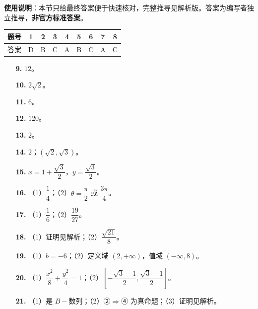 
\begin{gknotice}
\textbf{使用说明}：本节只给最终答案便于快速核对，完整推导见解析版。答案为编写者独立推导，\textbf{非官方标准答案}。
\end{gknotice}

\begin{center}\begin{tabular}{ccccccccc}
\toprule
题号 & 1 & 2 & 3 & 4 & 5 & 6 & 7 & 8 \\
\midrule
答案 & D & B & C & A & B & C & A & C \\
\bottomrule
\end{tabular}\end{center}

\begin{itemize}[leftmargin=2.6em]
  \item[\textbf{9.}] $12$。
  \item[\textbf{10.}] $2\sqrt2$。
  \item[\textbf{11.}] $6$。
  \item[\textbf{12.}] $120$。
  \item[\textbf{13.}] $2$。
  \item[\textbf{14.}] $2$；$(\sqrt2,\sqrt3)$。
  \item[\textbf{15.}] $x=1+\dfrac{\sqrt3}{2}$，$y=\dfrac{\sqrt3}{2}$。
\end{itemize}

\begin{itemize}[leftmargin=2.6em]
  \item[\textbf{16.}] （1）$\dfrac14$；（2）$\theta=\dfrac\pi2$ 或 $\dfrac{3\pi}{4}$。
  \item[\textbf{17.}] （1）$\dfrac16$；（2）$\dfrac{19}{27}$。
  \item[\textbf{18.}] （1）证明见解析；（2）$\dfrac{\sqrt{21}}{8}$。
  \item[\textbf{19.}] （1）$b=-6$；（2）定义域 $(2,+\infty)$，值域 $(-\infty,8)$。
  \item[\textbf{20.}] （1）$\dfrac{x^2}{8}+\dfrac{y^2}{4}=1$；（2）$\left[-\dfrac{\sqrt3-1}{2},\dfrac{\sqrt3-1}{2}\right]$。
  \item[\textbf{21.}] （1）是 $B-$数列；（2）②$\Rightarrow$④ 为真命题；（3）证明见解析。
\end{itemize}
